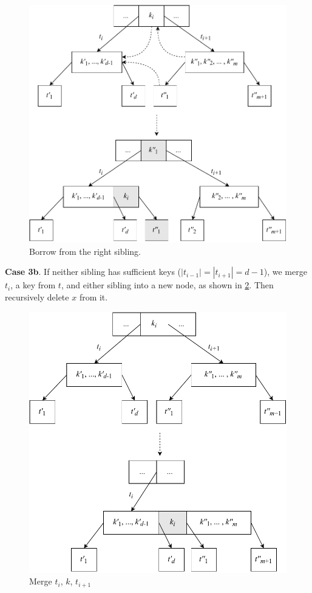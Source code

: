 \documentclass[b5paper]{article}
\begin{document}
\begin{figure}[htbp]
  \centering
  \includegraphics[scale=0.5]{img/btree-del-borrow}
  \caption{Borrow from the right sibling.}
  \label{fig:btree-del-borrow}
\end{figure}

\textbf{Case 3b}. If neither sibling has sufficient keys ($|t_{i-1}| = |t_{i+1}| = d - 1$), we merge $t_i$, a key from $t$, and either sibling into a new node, as shown in \cref{fig:btree-del-merge-subtree}. Then recursively delete $x$ from it.

\begin{figure}[htbp]
  \centering
  \includegraphics[scale=0.5]{img/btree-del-merge-subtree}
  \caption{Merge $t_i$, $k$, $t_{i+1}$}
  \label{fig:btree-del-merge-subtree}
\end{figure}
\end{document}
